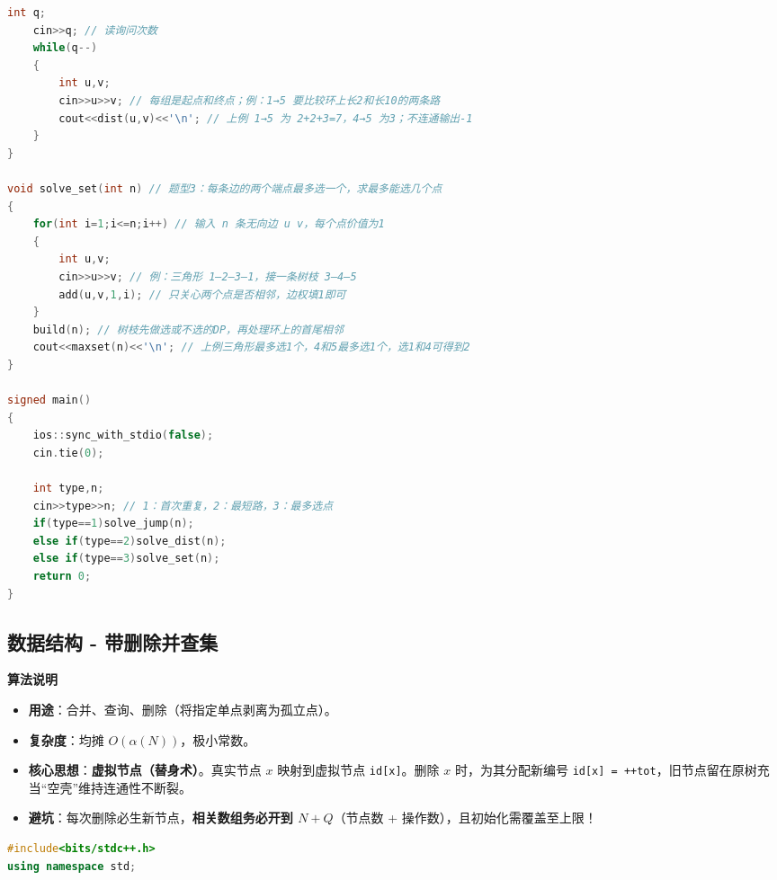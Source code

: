 \documentclass[10pt,landscape,a4paper]{article}
\begin{document}
\begin{multicols*}{3}
\begin{lstlisting}[language=C++]
    int q;
    cin>>q; // 读询问次数
    while(q--)
    {
        int u,v;
        cin>>u>>v; // 每组是起点和终点；例：1→5 要比较环上长2和长10的两条路
        cout<<dist(u,v)<<'\n'; // 上例 1→5 为 2+2+3=7，4→5 为3；不连通输出-1
    }
}

void solve_set(int n) // 题型3：每条边的两个端点最多选一个，求最多能选几个点
{
    for(int i=1;i<=n;i++) // 输入 n 条无向边 u v，每个点价值为1
    {
        int u,v;
        cin>>u>>v; // 例：三角形 1—2—3—1，接一条树枝 3—4—5
        add(u,v,1,i); // 只关心两个点是否相邻，边权填1即可
    }
    build(n); // 树枝先做选或不选的DP，再处理环上的首尾相邻
    cout<<maxset(n)<<'\n'; // 上例三角形最多选1个，4和5最多选1个，选1和4可得到2
}

signed main()
{
    ios::sync_with_stdio(false);
    cin.tie(0);

    int type,n;
    cin>>type>>n; // 1：首次重复，2：最短路，3：最多选点
    if(type==1)solve_jump(n);
    else if(type==2)solve_dist(n);
    else if(type==3)solve_set(n);
    return 0;
}
\end{lstlisting}
\subsection*{数据结构 - 带删除并查集}
\par\addvspace{0.7ex}\noindent\textbf{算法说明}\par\nobreak
\begin{itemize}
\item \textbf{用途}：合并、查询、删除（将指定单点剥离为孤立点）。
\item \textbf{复杂度}：均摊 $O(\alpha(N))$，极小常数。
\item \textbf{核心思想}：\textbf{虚拟节点（替身术）}。真实节点 $x$ 映射到虚拟节点 \texttt{i\allowbreak{}d\allowbreak{}[\allowbreak{}x\allowbreak{}]}。删除 $x$ 时，为其分配新编号 \texttt{i\allowbreak{}d\allowbreak{}[\allowbreak{}x\allowbreak{}]\allowbreak{} \allowbreak{}=\allowbreak{} \allowbreak{}+\allowbreak{}+\allowbreak{}t\allowbreak{}o\allowbreak{}t}，旧节点留在原树充当“空壳”维持连通性不断裂。
\item \textbf{避坑}：每次删除必生新节点，\textbf{相关数组务必开到 $N + Q$}（节点数 + 操作数），且初始化需覆盖至上限！
\end{itemize}
\par{}\par
\begin{lstlisting}[language=C++]
#include<bits/stdc++.h>
using namespace std;


\end{lstlisting}
\end{multicols*}
\end{document}
